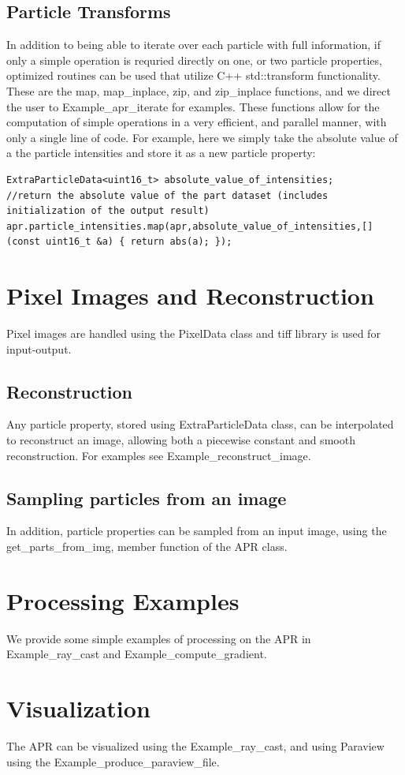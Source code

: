 \documentclass[12pt]{article}
\begin{document}
\subsection{Particle Transforms}
In addition to being able to iterate over each particle with full information, if only a simple operation is requried directly on one, or two particle properties, optimized routines can be used that utilize C++ std::transform functionality. These are the map, map\_inplace, zip, and zip\_inplace functions, and we direct the user to Example\_apr\_iterate for examples. These functions allow for the computation of simple operations in a very efficient, and parallel manner, with only a single line of code. For example, here we simply take the absolute value of a the particle intensities and store it as a new particle property:
\begin{lstlisting}
ExtraParticleData<uint16_t> absolute_value_of_intensities;
//return the absolute value of the part dataset (includes initialization of the output result)
apr.particle_intensities.map(apr,absolute_value_of_intensities,[](const uint16_t &a) { return abs(a); });
\end{lstlisting}
\section{Pixel Images and Reconstruction}
Pixel images are handled using the PixelData class and tiff library is used for input-output.
\subsection{Reconstruction}
Any particle property, stored using ExtraParticleData class, can be interpolated to reconstruct an image, allowing both a piecewise constant and smooth reconstruction. For examples see Example\_reconstruct\_image.
\subsection{Sampling particles from an image}
In addition, particle properties can be sampled from an input image, using the get\_parts\_from\_img, member function of the APR class.
\section{Processing Examples}
We provide some simple examples of processing on the APR in Example\_ray\_cast and Example\_compute\_gradient.
\section{Visualization}
The APR can be visualized using the Example\_ray\_cast, and using Paraview using the Example\_produce\_paraview\_file.
\end{document}
